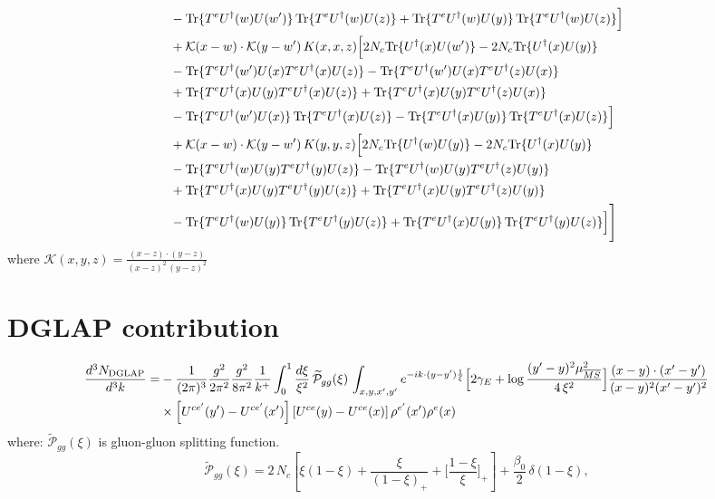 \documentclass[9pt]{article}
\numberwithin{equation}{section}
\begin{document}
\begin{align}
&-{\rm Tr}\{T^eU^\dagger(w)U(w')\}\,{\rm Tr}\{T^eU^\dagger(w)U(z)\}+{\rm Tr}\{T^eU^\dagger(w)U(y)\}\,{\rm Tr}\{T^eU^\dagger(w)U(z)\}\Big]\notag\\
&+\mathcal K(x-w)\cdot\mathcal K(y-w')\,K(x,x,z)\Big[2 N_{c}{\rm Tr}\{U^\dagger(x)U(w')\}-2 N_{c}{\rm Tr}\{U^\dagger(x)U(y)\}\notag\\
&-{\rm Tr}\{T^eU^\dagger(w')U(x)T^eU^\dagger(x)U(z)\}-{\rm Tr}\{T^eU^\dagger(w')U(x)T^eU^\dagger(z)U(x)\}\notag\\
&+{\rm Tr}\{T^eU^\dagger(x)U(y)T^eU^\dagger(x)U(z)\}+{\rm Tr}\{T^eU^\dagger(x)U(y)T^eU^\dagger(z)U(x)\}\notag\\
&-{\rm Tr}\{T^eU^\dagger(w')U(x)\}\,{\rm Tr}\{T^eU^\dagger(x)U(z)\}-{\rm Tr}\{T^eU^\dagger(x)U(y)\}\,{\rm Tr}\{T^eU^\dagger(x)U(z)\}\Big]\notag\\
&+\mathcal K(x-w)\cdot\mathcal K(y-w')\,K(y,y,z)\Big[2 N_{c}{\rm Tr}\{U^\dagger(w)U(y)\}-2 N_{c}{\rm Tr}\{U^\dagger(x)U(y)\}\notag\\
&-{\rm Tr}\{T^eU^\dagger(w)U(y)T^eU^\dagger(y)U(z)\}-{\rm Tr}\{T^eU^\dagger(w)U(y)T^eU^\dagger(z)U(y)\}\notag\\
&+{\rm Tr}\{T^eU^\dagger(x)U(y)T^eU^\dagger(y)U(z)\}+{\rm Tr}\{T^eU^\dagger(x)U(y)T^eU^\dagger(z)U(y)\}\notag\\
&-{\rm Tr}\{T^eU^\dagger(w)U(y)\}\,{\rm Tr}\{T^eU^\dagger(y)U(z)\}+{\rm Tr}\{T^eU^\dagger(x)U(y)\}\,{\rm Tr}\{T^eU^\dagger(y)U(z)\}\Big]\Bigg]
\end{align}
where $\mathcal{K}(x,y,z) = \frac{(x-z)\cdot (y-z)}{(x-z)^{2}\,(y-z)^{2}}$
\section{DGLAP contribution}
\begin{align}
\frac{d^{3}N_{\rm DGLAP}}{d^{3}k}= &-\frac{1}{(2\pi)^{3}}\frac{g^{2}}{2\pi^{2}}\frac{g^{2}}{8\pi^{2}}\frac{1}{k^{+}}\int_{0}^{1}\frac{d\xi}{\xi^{2}}\,\widetilde{\mathcal P}_{gg}(\xi)\,\int_{x,y,x',y'}e^{-ik\cdot(y-y')\frac{1}{\xi}}\Big[2\gamma_{E}+\log\frac{(y'-y)^{2}\mu^{2}_{\overline{MS}}}{4\,\xi^{2}}\Big]\frac{(x-y)\cdot(x'-y')}{(x-y)^{2}(x'-y')^{2}}\notag\\
&\times\left[U^{ce'}(y') - U^{ce'}(x')\right]\left[U^{ce}(y) - U^{ce}(x)\right]\rho^{e'}(x')\rho^{e}(x)
\end{align}
where:
$\widetilde{\mathcal{P}}_{gg}(\xi)$ is gluon-gluon splitting function.
$$\widetilde{\mathcal{P}}_{gg}(\xi) = 2\,N_{c}\left[\xi(1-\xi) + \frac{\xi}{(1-\xi)_{+}} + \Big[\frac{1-\xi}{\xi}\Big]_{+}\right]+\frac{\beta_{0}}{2}\,\delta(1-\xi),$$
\end{document}
